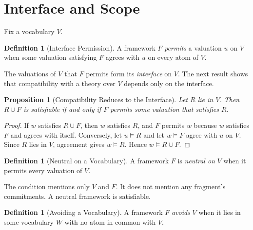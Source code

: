 \documentclass[11pt]{article}
\theoremstyle{plain}
\newtheorem{proposition}[theorem]{Proposition}
\theoremstyle{definition}
\newtheorem{definition}[theorem]{Definition}
\theoremstyle{remark}
\newcommand{\Framework}{F}
\begin{document}
\section{Interface and Scope}
\label{sec:interface}

Fix a vocabulary $V$.

\begin{definition}[Interface Permission]
  \label{se110.def.Permits}
  A framework $\Framework$ \emph{permits} a valuation $u$ on $V$ when some
  valuation satisfying $\Framework$ agrees with $u$ on every atom of $V$.
\end{definition}

The valuations of $V$ that $\Framework$ permits form its \emph{interface} on
$V$.
The next result shows that compatibility with a theory over $V$ depends only on
the interface.

\begin{proposition}[Compatibility Reduces to the Interface]
  \label{se110.proposition.SatisfiableUnionIffPermits}
  Let $R$ lie in $V$.
  Then $R \cup \Framework$ is satisfiable if and only if $\Framework$ permits
  some valuation that satisfies $R$.
\end{proposition}

\begin{proof}
  If $w$ satisfies $R \cup \Framework$, then $w$ satisfies $R$, and
  $\Framework$ permits $w$ because $w$ satisfies $\Framework$ and agrees with
  itself.
  Conversely, let $u \models R$ and let $w \models \Framework$ agree with $u$ on
  $V$.
  Since $R$ lies in $V$, agreement gives $w \models R$.
  Hence $w \models R \cup \Framework$.
\end{proof}

\begin{definition}[Neutral on a Vocabulary]
  \label{se110.def.NeutralOn}
  A framework $\Framework$ is \emph{neutral on} $V$ when it permits every
  valuation of $V$.
\end{definition}

The condition mentions only $V$ and $\Framework$.
It does not mention any fragment's commitments.
A neutral framework is satisfiable.

\begin{definition}[Avoiding a Vocabulary]
  \label{se110.def.AvoidsVocabulary}
  A framework $\Framework$ \emph{avoids} $V$ when it lies in some vocabulary
  $W$ with no atom in common with $V$.
\end{definition}
\end{document}
